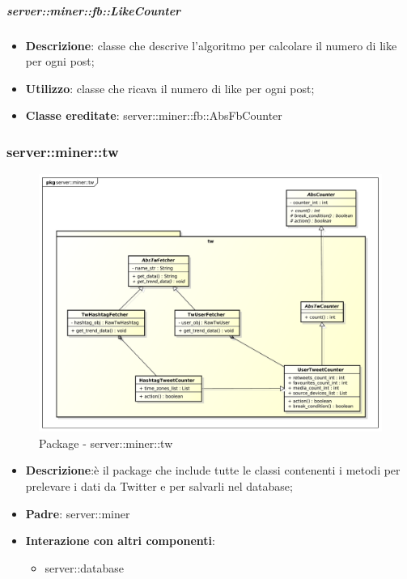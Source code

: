 	\subparagraph{server::miner::fb::LikeCounter} %
		\label{subp:server_miner_fb_LikeCounter}
			\begin{itemize}
				\item \textbf{Descrizione}: classe che descrive l'algoritmo per calcolare il numero di like per ogni post;
				\item \textbf{Utilizzo}: classe che ricava il numero di like per ogni post;
				\item \textbf{Classe ereditate}: server::miner::fb::AbsFbCounter
			\end{itemize}

\subsubsection{server::miner::tw} %
\label{ssub:bdsm_app_server_miner_tw}
\begin{figure}[htbp]
	\centering
	\centerline{\includegraphics[scale=0.4]{./images/server/miner_tw.pdf}}
	\caption{Package - server::miner::tw}
\end{figure}

\begin{itemize}
  \item \textbf{Descrizione}:è il package che include tutte le classi contenenti i metodi per prelevare i dati da Twitter e per salvarli nel database;
  \item \textbf{Padre}: server::miner
  \item \textbf{Interazione con altri componenti}:
  	\begin{itemize}
  		\item server::database
  	\end{itemize}
\end{itemize}

